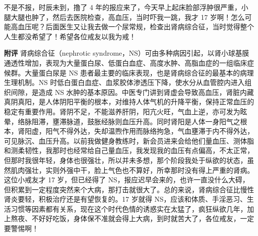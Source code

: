 \begin{case}
    不是不报，时辰未到，撸了 4 年的报应来了，今天早上起床脸部浮肿很严重，小腿大腿也肿了，然后去医院检查，高血压，当时吓我一跳，我才 17 岁啊！怎么可能高血压呢？后面医生又让我去做一个尿常规，检查出肾病综合征，当时觉得整个人生都没希望了！希望各位戒友以我为戒！

    \textbf{附评} 肾病综合征（nephrotic syndrome，NS）可由多种病因引起，以肾小球基膜通透性增加，表现为大量蛋白尿、低蛋白血症、高度水肿、高脂血症的一组临床症候群。大量蛋白尿是 NS 患者最主要的临床表现，也是肾病综合征的最基本的病理生理机制。NS 时低白蛋白血症、血浆胶体渗透压下降，使水分从血管腔内进入组织间隙，是造成 NS 水肿的基本原因。中医专门讲到肾虚会导致高血压，肾脏内藏真阴真阳，是人体阴阳平衡的根本，对维持人体气机的升降平衡，保持正常血压的稳定有重要作用。肾阴不足，不能滋养肝阴，阳亢火旺，气血上逆，亦可发为眩晕，络脉阻滞，壅滞脉道，鼓胀经脉则血压升高。同时肾阳是人体一身阳气之根本，肾阳虚，阳气不得外达，失却温煦作用而脉络拘急，气血壅滞于内不得外达，可见脉沉、血压升高。以前我做健身教练时，新会员进来会给他们量血压、测体脂和测柔韧性，我那时也经常给自己量血压，我发现我的血压有点偏高，不太正常，但那时我很年轻，身体也很强壮，所以并未多想，那个阶段我处于纵欲的状态，虽然肌肉强壮，实则外强中干，脸上气色也不算好，所幸那时没有得上严重的肾病。这位小戒友才 17 岁，但已经得了 NS，报应迟早会来的，也许一直没什么大碍，但积累到一定程度突然来个大病，那打击就很大了。总的来说，肾病综合征比慢性肾炎要轻，积极治疗还是有望恢复的。17 岁就得 NS，应该和体质、手淫恶习、生活习惯等因素都有关系，现在这个时代色情的诱惑实在太猛了，疯狂纵欲几年，加上熬夜、不好好吃饭，身体保不准就会得上大病，到时就苦大了，各位戒友，一定要警惕啊！
\end{case}

